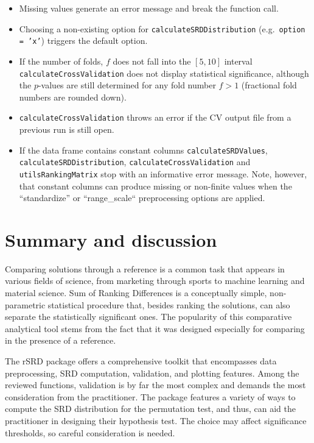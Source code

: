 \begin{itemize}
    \item Missing values generate an error message and break the function call.
    \item Choosing a non-existing option for \texttt{calculateSRDDistribution} (e.g.\ \texttt{option = 'x'}) triggers the default option.
    \item If the number of folds, $f$ does not fall into the $[5,10]$ interval \texttt{calculateCrossValidation} does not display statistical significance, although the $p$-values are still determined for any fold number $f>1$ (fractional fold numbers are rounded down).
    \item \texttt{calculateCrossValidation} throws an error if the CV output file from a previous run is still open.
    \item If the data frame contains constant columns \texttt{calculateSRDValues}, \texttt{calculateSRDDistribution}, \texttt{calculateCrossValidation} and \texttt{utilsRankingMatrix} stop with an informative error message. Note, however, that constant columns can produce missing or non-finite values when the “standardize” or “range\_scale“ preprocessing options are applied.
\end{itemize}

\section{Summary and discussion} \label{sec:summary}

Comparing solutions through a reference is a common task that appears in various fields of science, from marketing through sports to machine learning and material science. Sum of Ranking Differences is a conceptually simple, non-parametric statistical procedure that, besides ranking the solutions, can also separate the statistically significant ones. The popularity of this comparative analytical tool stems from the fact that it was designed especially for comparing in the presence of a reference.

The rSRD package offers a comprehensive toolkit that encompasses data preprocessing, SRD computation, validation, and plotting features. Among the reviewed functions, validation is by far the most complex and demands the most consideration from the practitioner. The package features a variety of ways to compute the SRD distribution for the permutation test, and thus, can aid the practitioner in designing their hypothesis test. The choice may affect significance thresholds, so careful consideration is needed.

